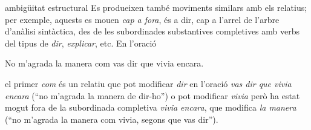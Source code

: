 \begin{enumerate}
\begin{persabermes}{ambigüitat estructural}
  Es produeixen també moviments similars amb els relatius; per
  exemple, aquests es mouen \emph{cap a fora}, és a dir, cap a l'arrel
  de l'arbre d'anàlisi sintàctica, des de les subordinades
  substantives completives amb verbs del tipus de {\em dir},
  \emph{explicar}, etc. En l'oració
\begin{example}
No m'agrada la manera com vas dir que vivia encara.
\end{example}
el primer \emph{com} és un relatiu que pot modificar \emph{dir} en
  l'oració \emph{vas dir que vivia encara} (``no m'agrada la manera de
  dir-ho'')  o pot modificar  {\em
  vivia} però ha estat mogut fora de la subordinada completiva \emph{vivia encara}, que modifica {\em
  la manera} (``no m'agrada la manera com vivia, segons que vas dir'').


\mbox{}%
\end{persabermes}




\end{enumerate}


